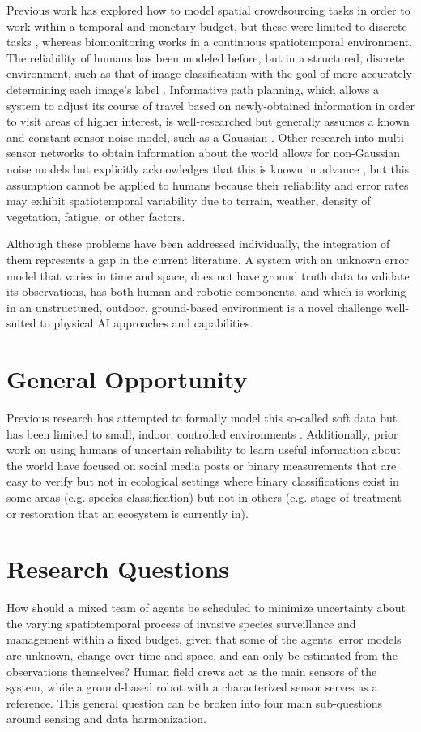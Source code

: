 \documentclass{article}
\begin{document}
Previous work has explored how to model spatial crowdsourcing tasks in order to work within a temporal and monetary budget, but these were limited to discrete tasks \cite{10.1007/s00778-019-00568-7}, whereas biomonitoring works in a continuous spatiotemporal environment. The reliability of humans has been modeled before, but in a structured, discrete environment, such as that of image classification with the goal of more accurately determining each image’s label \cite{whose-vote-should-count-more}. Informative path planning, which allows a system to adjust its course of travel based on newly-obtained information in order to visit areas of higher interest, is well-researched but generally assumes a known and constant sensor noise model, such as a Gaussian \cite{informative-path-planning-framework}. Other research into multi-sensor networks to obtain information about the world allows for non-Gaussian noise models but explicitly acknowledges that this is known in advance \cite{mobile-sensor-network-control}, but this assumption cannot be applied to humans \cite{6846739} because their reliability and error rates may exhibit spatiotemporal variability due to terrain, weather, density of vegetation, fatigue, or other factors.

Although these problems have been addressed individually, the integration of them represents a gap in the current literature. A system with an unknown error model that varies in time and space, does not have ground truth data to validate its observations, has both human and robotic components, and which is working in an unstructured, outdoor, ground-based environment is a novel challenge well-suited to physical AI approaches and capabilities.


\section{General Opportunity}
Previous research has attempted to formally model this so-called soft data but has been limited to small, indoor, controlled environments \cite{6301744}. Additionally, prior work on using humans of uncertain reliability to learn useful information about the world have focused on social media posts \cite{6846739} or binary measurements that are easy to verify \cite{on-truth-discovery} but not in ecological settings where binary classifications exist in some areas (e.g. species classification) but not in others (e.g. stage of treatment or restoration that an ecosystem is currently in).


\section{Research Questions}
How should a mixed team of agents be scheduled to minimize uncertainty about the varying spatiotemporal process of invasive species surveillance and management within a fixed budget, given that some of the agents’ error models are unknown, change over time and space, and can only be estimated from the observations themselves? Human field crews act as the main sensors of the system, while a ground-based robot with a characterized sensor serves as a reference. This general question can be broken into four main sub-questions around sensing and data harmonization.
\end{document}
